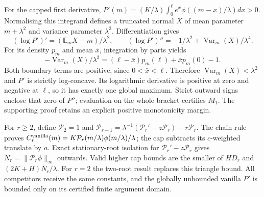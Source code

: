 \documentclass[11pt]{article}
\newcommand{\E}{\mathbb E}
\DeclareMathOperator{\Var}{Var}
\begin{document}
For the capped first derivative,
$P'(m)=(K/\lambda)\int_0^\ell e^x\phi((m-x)/\lambda)dx>0$.
Normalising this integrand defines a truncated normal $X$ of mean parameter
$m+\lambda^2$ and variance parameter $\lambda^2$. Differentiation gives
\begin{equation}
 (\log P')'=(\E_mX-m)/\lambda^2,\qquad
 (\log P')''=-1/\lambda^2+\Var_m(X)/\lambda^4.
\end{equation}
For its density $p_m$ and mean $\bar x$, integration by parts yields
\begin{equation}
 -\Var_m(X)/\lambda^2
 =(\ell-\bar x)p_m(\ell)+\bar x p_m(0)-1.
\end{equation}
Both boundary terms are positive, since $0<\bar x<\ell$.
Therefore $\Var_m(X)<\lambda^2$ and $P'$ is strictly log-concave.
Its logarithmic derivative is positive at zero and negative at $\ell$,
so it has exactly one global maximum. Strict outward signs enclose that
zero of $P''$; evaluation on the whole bracket certifies $M_1$.
The supporting proof retains an explicit positive monotonicity margin.

For $r\geq2$, define
$\mathcal P_2=1$ and $\mathcal P_{r+1}=\lambda^{-1}(\mathcal P_r'-z\mathcal P_r)-r\mathcal P_r$.
The chain rule proves
$C_r^{\rm vanilla}(m)=K\mathcal P_r(m/\lambda)\phi(m/\lambda)/\lambda$;
the cap subtracts its $c$-weighted translate by $a$.
Exact stationary-root isolation for $\mathcal P_r'-z\mathcal P_r$ gives
$N_r=\|\mathcal P_r\phi\|_\infty$ outwards. Valid higher cap bounds are the
smaller of $H\overline D_r$ and $(2K+H)\overline N_r/\lambda$.
For $r=2$ the two-root result replaces this triangle bound. All competitors
receive the same constants, and the globally unbounded vanilla $P'$ is
bounded only on its certified finite argument domain.
\end{document}
